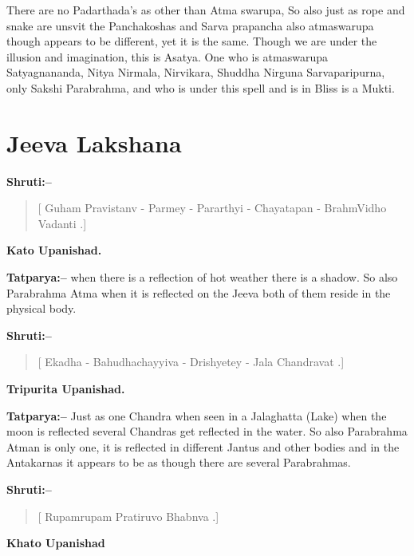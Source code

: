 There are no Padarthada's as other than Atma swarupa, So also just as rope and snake are unsvit the Panchakoshas and Sarva prapancha also atmaswarupa though appears to be different, yet it is the same. Though we are under the illusion and imagination, this is Asatya. One who is atmaswarupa Satyagnananda, Nitya Nirmala, Nirvikara, Shuddha Nirguna Sarvaparipurna, only Sakshi Parabrahma, and who is under this spell and is in Bliss is a Mukti.

\chapter{Jeeva Lakshana}

\textbf{Shruti:–}

\begin{verse}
[ Guham Pravistanv - Parmey - Pararthyi - Chayatapan - BrahmVidho Vadanti .]
\end{verse}

\begin{flushright}
\textbf{Kato Upanishad.}
\end{flushright}

\textbf{Tatparya:–} when there is a reflection of hot weather there is a shadow. So also Parabrahma Atma when it is reflected on the Jeeva both of them reside in the physical body.

\textbf{Shruti:–}

\begin{verse}
[ Ekadha - Bahudhachayyiva - Drishyetey - Jala Chandravat .]
\end{verse}

\begin{flushright}
\textbf{Tripurita Upanishad.}
\end{flushright}

\textbf{Tatparya:–} Just as one Chandra when seen in a Jalaghatta (Lake) when the moon is reflected several Chandras get reflected in the water. So also Parabrahma Atman is only one, it is reflected in different Jantus and other bodies and in the Antakarnas it appears to be as though there are several Parabrahmas.

\newpage

\textbf{Shruti:–}

\begin{verse}
[ Rupamrupam Pratiruvo Bhabnva .]
\end{verse}

\begin{flushright}
\textbf{Khato Upanishad}
\end{flushright}

